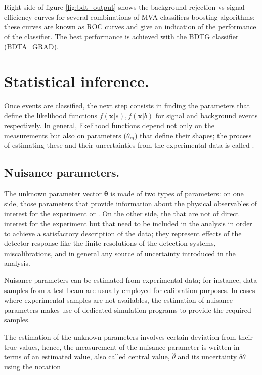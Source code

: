 Right side of figure \ref{fig:bdt_output} shows the background rejection vs signal efficiency curves for several combinations of MVA classifiers-boosting algorithms; these curves are known as ROC curves and give an indication of the performance of the classifier. The best performance is achieved with the BDTG classifier (BDTA\_GRAD).   

\section{Statistical inference.}

Once events are classified, the next step consists in finding the parameters that define the likelihood functions $f(\textbf{x}|s), f(\textbf{x}|b)$ for signal and background events respectively. In general, likelihood functions depend not only on the measurements but also on parameters ($\theta_m$) that define their shapes; the process of estimating these  and their uncertainties from the experimental data is called . 

\subsection{Nuisance parameters.}

The unknown parameter vector $\bm{\theta}$ is made of two types of parameters: on one side, those parameters that provide information about the physical observables of interest for the experiment or . On the other side, the  that are not of direct interest for the experiment but that need to be included in the analysis in order to achieve a satisfactory description of the data; they represent effects of the detector response like the finite resolutions of the detection systems, miscalibrations, and in general any source of uncertainty introduced in the analysis.

Nuisance parameters can be estimated from experimental data; for instance, data samples from a test beam are usually employed for calibration purposes. In cases where experimental samples are not availables, the estimation of nuisance parameters makes use of dedicated simulation programs to provide the required samples.

The estimation of the unknown parameters involves certain deviation from their true values, hence, the measurement of the nuisance parameter is written in terms of an estimated value, also called central value,  $\hat{\theta}$ and its uncertainty $\delta \theta$ using the notation

